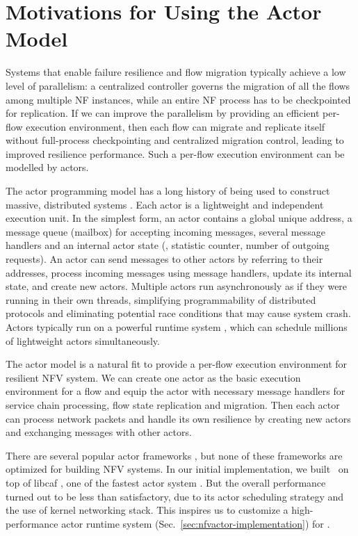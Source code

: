 \section{Motivations for Using the Actor Model}
\label{sec:nfvactor-motivation}

Systems that enable failure resilience \cite{sherry2015rollback,rajagopalan2013pico} and flow migration \cite{rajagopalan2013split, gember2015opennf} typically achieve a low level of parallelism: a centralized controller governs the migration of all the flows among multiple NF instances, while an entire NF process has to be checkpointed for replication. If we can improve the parallelism by providing an efficient per-flow execution environment, then each flow can migrate and replicate itself without full-process checkpointing and centralized migration control, leading to improved resilience performance. Such a per-flow execution environment can be modelled by actors.

The actor programming model \cite{actor-wiki, erlang, akka, caf} has a long history of being used to construct massive, distributed systems \cite{actor-wiki, akka, newell2016optimizing, AnalysisActor}. Each actor is a lightweight and independent execution unit. In the simplest form, an actor contains a global unique address, a message queue (mailbox) for accepting incoming messages, several message handlers and an internal actor state (\eg, statistic counter, number of outgoing requests). An actor can send messages to other actors by referring to their addresses, process incoming messages using message handlers, update its internal state, and create new actors. Multiple actors run asynchronously as if they were running in their own threads, simplifying programmability of distributed protocols and eliminating potential race conditions that may cause system crash. Actors typically run on a powerful runtime system \cite{caf}, which can schedule millions of lightweight actors simultaneously.

The actor model is a natural fit to provide a per-flow execution environment for resilient NFV system. We can create one actor as the basic execution environment for a flow and equip the actor with necessary message handlers for service chain processing, flow state replication and migration. Then each actor can process network packets and handle its own resilience by creating new actors and exchanging messages with other actors.

There are several popular actor frameworks \cite{akka, erlang, Orleans, caf}, but none of these frameworks are optimized for building NFV systems. In our initial implementation, we built \nfactor~on top of libcaf \cite{caf}, one of the fastest actor system \cite{chs-rapc-16}. But the overall performance turned out to be less than satisfactory, due to its actor scheduling strategy and the use of kernel networking stack. This inspires us to customize a high-performance actor runtime system (Sec.~\ref{sec:nfvactor-implementation}) for \nfactor.
